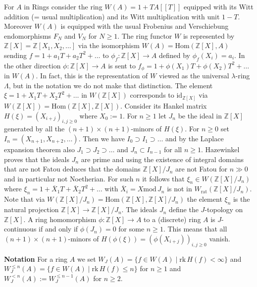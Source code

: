 \documentclass[12pt,leqno]{article}
\newcommand{\Z}{{\mathbb{Z}}}
\newcommand{\id}{\mathrm{id}}
\renewcommand{\mod}{\mathrm{mod}\,}
\newcommand{\rk}{\mathrm{rk}\,}
\newcommand{\Hom}{\mathrm{Hom}}
\newcommand{\rat}{\mathrm{rat}}
\newcommand{\oX}{\overline{X}}
\begin{document}
For $A$ in Rings consider the ring $W (A) = 1 + TA [[T]]$ equipped with its Witt addition (= usual multiplication) and its Witt multiplication with unit $1-T$. Moreover $W (A)$ is equipped with the usual Frobenius and Verschiebung endomorphisms $F_N$ and $V_N$ for $N \ge 1$. The ring functor $W$ is represented by $\Z [X] = \Z [X_1 , X_2 , \ldots]$ via the isomorphism $W (A) = \Hom (\Z [X] , A)$ sending $f = 1  + a_1 T + a_2 T^2 + \ldots$ to $\phi_f : \Z [X] \to A$ defined by $\phi_f (X_i) = a_i$. In the other direction $\phi : \Z [X] \to A$ is sent to $f_{\phi} = 1 + \phi (X_1) T + \phi (X_2) T^2 + \ldots$ in $W (A)$. In fact, this is the representation of $W$ viewed as the universal $\lambda$-ring $\Lambda$, but in the notation we do not make that distinction. The element $\xi = 1 + X_1 T + X_2 T^2 + \ldots$ in $W (\Z [X])$ corresponds to $\id_{\Z [X]}$ via $W (\Z [X]) = \Hom (\Z [X] , \Z [X])$. Consider its Hankel matrix $H (\xi) = (X_{i+j})_{i,j \ge 0}$ where $X_0 := 1$. For $n \ge 1$ let $J_n$ be the ideal in $\Z [X]$ generated by all the $(n+1) \times (n+1)$-minors of $H (\xi)$. For $n \ge 0$ set $I_n = (X_{n+1} , X_{n+2} , \ldots)$. Then we have $I_0 \supset I_1 \supset \ldots$ and by the Laplace expansion theorem also $J_1 \supset J_2 \supset \ldots$ and $J_n \subset I_{n-1}$ for all $n \ge 1$. Hazewinkel \cite{H} proves that the ideals $J_n$ are prime and using the existence of integral domains that are not Fatou deduces that the domains $\Z [X] / J_n$ are not Fatou for $n \gg 0$ and in particular not Noetherian. For such $n$ it follows that $\xi_n \in W (\Z [X] / J_n)$ where $\xi_n = 1 + \oX_1 T + \oX_2 T^2 + \ldots$ with $\oX_i = X \mod J_n$ is not in $W_{\rat} (\Z [X] / J_n)$. Note that via $W (\Z [X] / J_n) = \Hom (\Z [X] , \Z [X] / J_n)$ the element $\xi_n$ is the natural projection $\Z [X] \to \Z [X] / J_n$. The ideals $J_n$ define the $J$-topology on $\Z [X]$. A ring homomorphism $\phi : \Z [X] \to A$ to a (discrete) ring $A$ is $J$-continuous if and only if $\phi (J_n) = 0$ for some $n \ge 1$. This means that all $(n+1) \times (n+1)$-minors of $H (\phi (\xi)) = (\phi (X_{i+j}))_{i,j \ge 0}$ vanish.

\textbf{Notation} For a ring $A$ we set $W_J (A) = \{ f \in W (A) \mid \rk H (f) < \infty \}$ and $W^{\le n}_J (A) = \{ f \in W (A) \mid \rk H (f) \le n \}$ for $n \ge 1$ and $W^{< n}_J (A) := W^{\le n-1}_J (A)$ for $n \ge 2$. 
\end{document}
